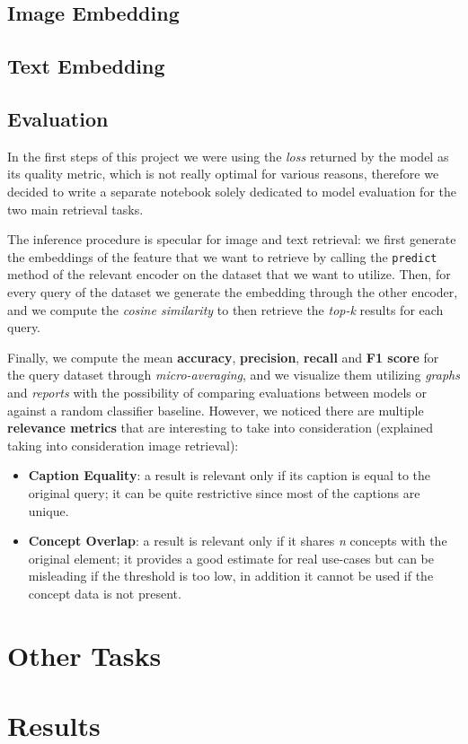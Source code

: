 \documentclass[12pt, a4paper]{article}
\begin{document}
\subsection{Image Embedding}
\blindtext[1]

\subsection{Text Embedding}
\blindtext[1]

\subsection{Evaluation}
In the first steps of this project we were using the \textit{loss} returned by the model as its quality metric, which is not really optimal for various reasons, therefore we decided to write a separate notebook solely dedicated to model evaluation for the two main retrieval tasks.

The inference procedure is specular for image and text retrieval: we first generate the embeddings of the feature that we want to retrieve by calling the \texttt{predict} method of the relevant encoder on the dataset that we want to utilize.
Then, for every query of the dataset we generate the embedding through the other encoder, and we compute the \textit{cosine similarity} to then retrieve the \textit{top-k} results for each query.

Finally, we compute the mean \textbf{accuracy}, \textbf{precision}, \textbf{recall} and \textbf{F1 score} for the query dataset through \textit{micro-averaging}, and we visualize them utilizing \textit{graphs} and \textit{reports} with the possibility of comparing evaluations between models or against a random classifier baseline.
However, we noticed there are multiple \textbf{relevance metrics} that are interesting to take into consideration (explained taking into consideration image retrieval):
\begin{itemize}
    \item \textbf{Caption Equality}: a result is relevant only if its caption is equal to the original query; it can be quite restrictive since most of the captions are unique.
    \item \textbf{Concept Overlap}: a result is relevant only if it shares \textit{n} concepts with the original element; it provides a good estimate for real use-cases but can be misleading if the threshold is too low, in addition it cannot be used if the concept data is not present.
\end{itemize}

\section{Other Tasks}

\section{Results}
\blindtext[1]
\end{document}
